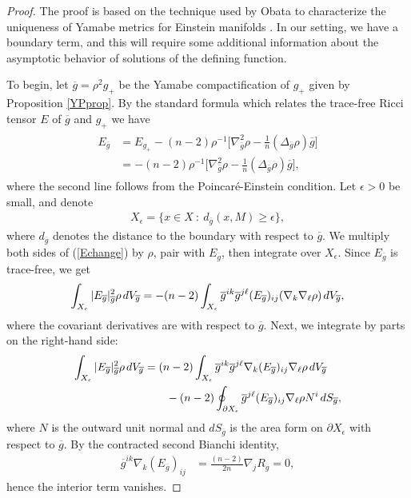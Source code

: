 \documentclass{amsart}
\newcommand{\hs}{\hskip.02in}
\theoremstyle{definition}
\theoremstyle{remark}
\numberwithin{equation}{section}
\begin{document}
\begin{proof}  The proof is based on the technique used by Obata to characterize the uniqueness of Yamabe metrics for Einstein manifolds \cite{Obata}.  In our setting, we have a boundary term, and this will require some additional information about the asymptotic behavior of solutions of the defining function.

To begin, let $\overline{g} = \rho^2 g_{+}$ be the Yamabe compactification of $g_{+}$ given by Proposition \ref{YPprop}.  By the standard formula which relates the trace-free Ricci tensor $E$ of $\overline{g}$ and $g_{+}$ we have
\begin{align} \label{Echange}  \begin{split}
E_{\overline{g}} &= E_{g_{+}} - (n-2) \rho^{-1} \big[ \nabla_{\overline{g}}^2 \rho - \frac{1}{n}  ( \Delta_{\overline{g}} \rho ) \overline{g} \big] \\
&=  - (n-2) \rho^{-1} \big[ \nabla_{\overline{g}}^2 \rho - \frac{1}{n}  ( \Delta_{\overline{g}} \rho ) \overline{g} \big],
\end{split}
\end{align}
where the second line follows from the Poincar\'e-Einstein condition.  Let $\epsilon > 0$ be small, and denote
\begin{align*}
X_{\epsilon} = \{ x \in X \ :\ d_{\overline{g}}(x,M) \geq \epsilon \},
\end{align*}
where $d_{\overline{g}}$ denotes the distance to the boundary with respect to $\overline{g}$.  We multiply both sides of (\ref{Echange}) by $\rho$, pair with $E_{\overline{g}}$, then integrate over $X_{\epsilon}$.  Since $E_{\overline{g}}$ is trace-free, we get
\begin{align*} %
\int_{X_{\epsilon}} | E_{\overline{g}}|^2_{\overline{g}} \rho  \hs dV_{\overline{g}} = - (n-2)  \int_{X_{\epsilon}} \overline{g}^{ik} \overline{g}^{j \ell} ( E_{\overline{g}})_{ij} ( \nabla_k \nabla_{\ell} \rho )  \hs dV_{\overline{g}}, \end{align*}
where the covariant derivatives are with respect to $\overline{g}$.  Next, we integrate by parts on the right-hand side: %
\begin{align} \label{s2}\begin{split}
\int_{X_{\epsilon}} | E_{\overline{g}}|^2_{\overline{g}} \rho\hs dV_{\overline{g}} &=   (n-2)  \int_{X_{\epsilon}} \overline{g}^{ik} \overline{g}^{j \ell} \nabla_k ( E_{\overline{g}})_{ij} \nabla_{\ell} \rho  \hs dV_{\overline{g}}\\
&\qquad - (n-2) \oint_{\partial X_{\epsilon}}\overline{g}^{j \ell} ( E_{\overline{g}} )_{ij} \nabla_{\ell} \rho  N^i \hs dS_{\overline{g}},
\end{split}\end{align}
where $N$ is the outward unit normal and $dS_{\overline{g}}$ is the area form on $\partial X_{\epsilon}$ with respect to $\overline{g}$.  By the contracted second Bianchi identity,
\begin{align*}
\overline{g}^{ik} \nabla_k ( E_{\overline{g}})_{ij} &= \frac{(n-2)}{2n} \nabla_j R_{\overline{g}} = 0,
\end{align*}
hence the interior term vanishes.


\end{proof}
\end{document}

